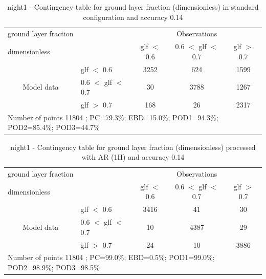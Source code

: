 \begin{table}[p!]
\begin{center}
\begin{tabular}{llccc}
\hline
{ground layer fraction}                                       &                                                    & \multicolumn{3}{c}{Observations}                 \\
{dimensionless}                                       &                             & glf $<$ 0.6   & 0.6 $<$ glf $<$ 0.7 & glf $>$ 0.7 \\
\hline
\multicolumn{1}{c}{\multirow{3}{*}{Model data}}  & glf $<$ 0.6             & 3252                & 624                       & 1599              \\
                                                 & 0.6  $<$ glf $<$ 0.7 & 30                & 3788                       & 1267              \\
                                                 & glf $>$ 0.7             & 168                & 26                       & 2317              \\
\hline
\multicolumn{5}{l}{ Number of points        11804 ; PC=79.3\%; EBD=15.0\%; POD1=94.3\%; POD2=85.4\%; POD3=44.7\%}
\end{tabular}
\end{center}
\caption{night1 - Contingency table for  ground layer fraction (dimensionless) in standard configuration and accuracy 0.14}
\label{tab:contingencyglfBEF:night1}
\end{table}
\begin{table}[p!]
\begin{center}
\begin{tabular}{llccc}
\hline
{ground layer fraction}                                       &                                                    & \multicolumn{3}{c}{Observations}                 \\
{dimensionless}                                       &                             & glf $<$ 0.6   & 0.6 $<$ glf $<$ 0.7 & glf $>$ 0.7 \\
\hline
\multicolumn{1}{c}{\multirow{3}{*}{Model data}}  & glf $<$ 0.6             & 3416                & 41                       & 30              \\
                                                 & 0.6  $<$ glf $<$ 0.7 & 10                & 4387                       & 29              \\
                                                 & glf $>$ 0.7             & 24                & 10                       & 3886              \\
\hline
\multicolumn{5}{l}{ Number of points        11804 ; PC=99.0\%; EBD=0.5\%; POD1=99.0\%; POD2=98.9\%; POD3=98.5\%}
\end{tabular}
\end{center}
\caption{night1 - Contingency table for  ground layer fraction (dimensionless) processed with AR (1H) and accuracy 0.14}
\label{tab:contingencyglfAFT:night1}
\end{table}
